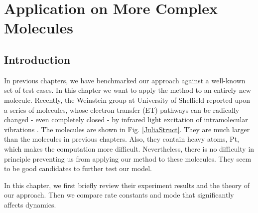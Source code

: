 \chapter{Application on More Complex Molecules}\label{chap:chapt4}
\section{Introduction}

In previous chapters, we have benchmarked our approach against  a well-known set of test cases. In this chapter we want to apply the method to an entirely new molecule.
 Recently, the Weinstein group at University of Sheffield reported upon a series of molecules, whose electron transfer (ET) pathways can be radically changed - even completely closed - by infrared light excitation of intramolecular vibrations \cite{delor2014toward,delor2015mechanism,scattergood2014electron}. The molecules are shown in Fig. \ref{JuliaStruct}. They are much larger than the molecules in previous chapters. Also, they contain heavy atoms, Pt, which makes the computation more difficult. Nevertheless, there is no difficulty in principle preventing us from applying our method to these molecules. They seem to be good candidates to further test our model.

In this chapter, we first briefly review their experiment results and the theory of our approach. Then we compare  rate constants and mode that significantly affects dynamics.

